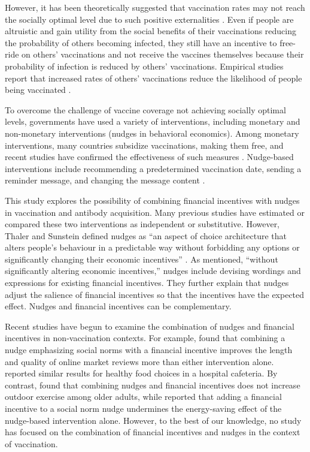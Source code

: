 \documentclass[
      12pt,
    a4paper
]{article}
\begin{document}
However, it has been theoretically suggested that vaccination rates may not reach the socially optimal level due to such positive externalities \citep{Brito1991a, Francis1997, Stiglitz2000}. Even if people are altruistic and gain utility from the social benefits of their vaccinations reducing the probability of others becoming infected, they still have an incentive to free-ride on others' vaccinations and not receive the vaccines themselves because their probability of infection is reduced by others' vaccinations. Empirical studies report that increased rates of others' vaccinations reduce the likelihood of people being vaccinated \citep{Hershey1994, Ibuka2014}.

To overcome the challenge of vaccine coverage not achieving socially optimal levels, governments have used a variety of interventions, including monetary and non-monetary interventions (nudges in behavioral economics). Among monetary interventions, many countries subsidize vaccinations, making them free, and recent studies have confirmed the effectiveness of such measures \citep{Barber2022, Brehm2022}. Nudge-based interventions include recommending a predetermined vaccination date, sending a reminder message, and changing the message content \citep{Chapman2010, Sasaki2022, Yokum2018}.

This study explores the possibility of combining financial incentives with nudges in vaccination and antibody acquisition. Many previous studies have estimated or compared these two interventions as independent or substitutive. However, Thaler and Sunstein defined nudges as ``an aspect of choice architecture that alters people's behaviour in a predictable way without forbidding any options or significantly changing their economic incentives'' \citep[p.6]{Thaler2009}. As mentioned, ``without significantly altering economic incentives,'' nudges include devising wordings and expressions for existing financial incentives. They further explain that nudges adjust the salience of financial incentives so that the incentives have the expected effect. Nudges and financial incentives can be complementary.

Recent studies have begun to examine the combination of nudges and financial incentives in non-vaccination contexts. For example, \citet{Burtch2018} found that combining a nudge emphasizing social norms with a financial incentive improves the length and quality of online market reviews more than either intervention alone. \citet{Thorndike2016} reported similar results for healthy food choices in a hospital cafeteria. By contrast, \citet{Kullgren2014} found that combining nudges and financial incentives does not increase outdoor exercise among older adults, while \citet{Pellerano2017} reported that adding a financial incentive to a social norm nudge undermines the energy-saving effect of the nudge-based intervention alone. However, to the best of our knowledge, no study has focused on the combination of financial incentives and nudges in the context of vaccination.
\end{document}
